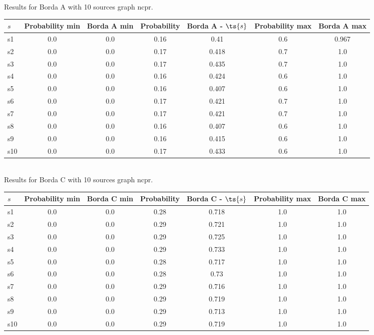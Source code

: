 \documentclass{article}
\begin{document}
\noindent Results for Borda A with 10 sources graph ncpr.

\noindent\begin{tabular}{|l|c|c|c|c|c|c|}
\hline
$s$& Probability min & Borda A min & Probability & Borda A - $\ts{s}$ & Probability max & Borda A max\\
\hline
s1 &0.0 & 0.0 & 0.16 & 0.41 & 0.6 & 0.967\\
\hline
s2 &0.0 & 0.0 & 0.17 & 0.418 & 0.7 & 1.0\\
\hline
s3 &0.0 & 0.0 & 0.17 & 0.435 & 0.7 & 1.0\\
\hline
s4 &0.0 & 0.0 & 0.16 & 0.424 & 0.6 & 1.0\\
\hline
s5 &0.0 & 0.0 & 0.16 & 0.407 & 0.6 & 1.0\\
\hline
s6 &0.0 & 0.0 & 0.17 & 0.421 & 0.7 & 1.0\\
\hline
s7 &0.0 & 0.0 & 0.17 & 0.421 & 0.7 & 1.0\\
\hline
s8 &0.0 & 0.0 & 0.16 & 0.407 & 0.6 & 1.0\\
\hline
s9 &0.0 & 0.0 & 0.16 & 0.415 & 0.6 & 1.0\\
\hline
s10 &0.0 & 0.0 & 0.17 & 0.433 & 0.6 & 1.0\\
\hline
\end{tabular}\\

\noindent Results for Borda C with 10 sources graph ncpr.

\noindent\begin{tabular}{|l|c|c|c|c|c|c|}
\hline
$s$& Probability min & Borda C min & Probability & Borda C - $\ts{s}$ & Probability max & Borda C max\\
\hline
s1 &0.0 & 0.0 & 0.28 & 0.718 & 1.0 & 1.0\\
\hline
s2 &0.0 & 0.0 & 0.29 & 0.721 & 1.0 & 1.0\\
\hline
s3 &0.0 & 0.0 & 0.29 & 0.725 & 1.0 & 1.0\\
\hline
s4 &0.0 & 0.0 & 0.29 & 0.733 & 1.0 & 1.0\\
\hline
s5 &0.0 & 0.0 & 0.28 & 0.717 & 1.0 & 1.0\\
\hline
s6 &0.0 & 0.0 & 0.28 & 0.73 & 1.0 & 1.0\\
\hline
s7 &0.0 & 0.0 & 0.29 & 0.716 & 1.0 & 1.0\\
\hline
s8 &0.0 & 0.0 & 0.29 & 0.719 & 1.0 & 1.0\\
\hline
s9 &0.0 & 0.0 & 0.29 & 0.713 & 1.0 & 1.0\\
\hline
s10 &0.0 & 0.0 & 0.29 & 0.719 & 1.0 & 1.0\\
\hline
\end{tabular}\\
\end{document}
